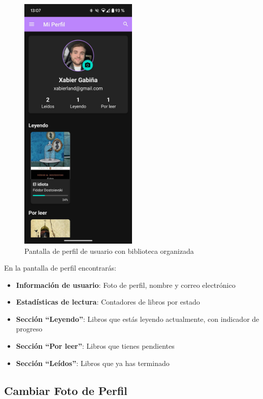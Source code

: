 \documentclass[a4paper,12pt]{report}
\begin{document}
    \begin{figure}[H]
      \centering
      \includegraphics[width=0.5\textwidth]{.img/profile.png}
      \caption{Pantalla de perfil de usuario con biblioteca organizada}
      \label{fig:perfil}
    \end{figure}
    
    En la pantalla de perfil encontrarás:
    \begin{itemize}
      \item \textbf{Información de usuario}: Foto de perfil, nombre y correo electrónico
      \item \textbf{Estadísticas de lectura}: Contadores de libros por estado
      \item \textbf{Sección ``Leyendo''}: Libros que estás leyendo actualmente, con indicador de progreso
      \item \textbf{Sección ``Por leer''}: Libros que tienes pendientes
      \item \textbf{Sección ``Leídos''}: Libros que ya has terminado
    \end{itemize}
    
    \subsection{Cambiar Foto de Perfil}
    
\end{document}
